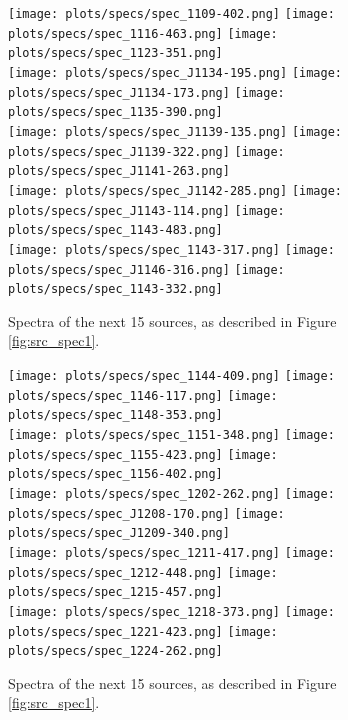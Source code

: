 \documentclass[preprint]{aastex}
\begin{document}
\begin{figure}\centering
\texttt{[image: plots/specs/spec\_1109-402.png]}
\texttt{[image: plots/specs/spec\_1116-463.png]}
\texttt{[image: plots/specs/spec\_1123-351.png]}\\
\texttt{[image: plots/specs/spec\_J1134-195.png]}
\texttt{[image: plots/specs/spec\_J1134-173.png]}
\texttt{[image: plots/specs/spec\_1135-390.png]}\\
\texttt{[image: plots/specs/spec\_J1139-135.png]}
\texttt{[image: plots/specs/spec\_J1139-322.png]}
\texttt{[image: plots/specs/spec\_J1141-263.png]}\\
\texttt{[image: plots/specs/spec\_J1142-285.png]}
\texttt{[image: plots/specs/spec\_J1143-114.png]}
\texttt{[image: plots/specs/spec\_1143-483.png]}\\
\texttt{[image: plots/specs/spec\_1143-317.png]}
\texttt{[image: plots/specs/spec\_J1146-316.png]}
\texttt{[image: plots/specs/spec\_1143-332.png]}\\
\caption{Spectra of the next 15 sources, as described in Figure \ref{fig:src_spec1}.
}\label{fig:src_spec16}
\end{figure}\clearpage

\begin{figure}\centering
\texttt{[image: plots/specs/spec\_1144-409.png]}
\texttt{[image: plots/specs/spec\_1146-117.png]}
\texttt{[image: plots/specs/spec\_1148-353.png]}\\
\texttt{[image: plots/specs/spec\_1151-348.png]}
\texttt{[image: plots/specs/spec\_1155-423.png]}
\texttt{[image: plots/specs/spec\_1156-402.png]}\\
\texttt{[image: plots/specs/spec\_1202-262.png]}
\texttt{[image: plots/specs/spec\_J1208-170.png]}
\texttt{[image: plots/specs/spec\_J1209-340.png]}\\
\texttt{[image: plots/specs/spec\_1211-417.png]}
\texttt{[image: plots/specs/spec\_1212-448.png]}
\texttt{[image: plots/specs/spec\_1215-457.png]}\\
\texttt{[image: plots/specs/spec\_1218-373.png]}
\texttt{[image: plots/specs/spec\_1221-423.png]}
\texttt{[image: plots/specs/spec\_1224-262.png]}\\
\caption{Spectra of the next 15 sources, as described in Figure \ref{fig:src_spec1}.
}\label{fig:src_spec17}
\end{figure}\clearpage
\end{document}
